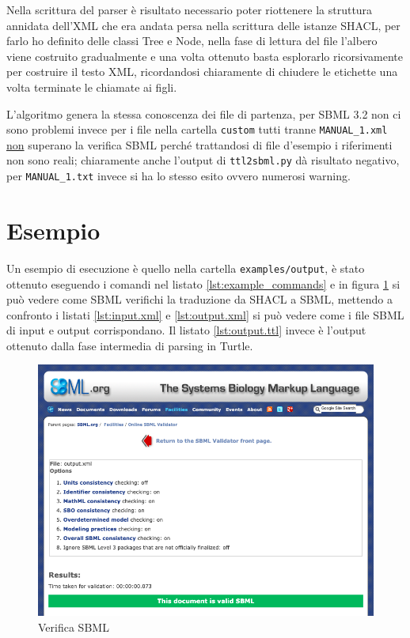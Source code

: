 \documentclass{article}
\begin{document}
Nella scrittura del parser è risultato necessario poter riottenere la struttura annidata dell'XML che era andata persa nella scrittura delle istanze SHACL, per farlo ho definito delle classi Tree e Node, nella fase di lettura del file l'albero viene costruito gradualmente e una volta ottenuto basta esplorarlo ricorsivamente per costruire il testo XML, ricordandosi chiaramente di chiudere le etichette una volta terminate le chiamate ai figli. 

L'algoritmo genera la stessa conoscenza dei file di partenza, per SBML 3.2 non ci sono problemi invece per i file nella cartella \texttt{custom} tutti tranne \texttt{MANUAL\_1.xml} \underline{non} superano la verifica SBML perché trattandosi di file d'esempio i riferimenti non sono reali; chiaramente anche l'output di \texttt{ttl2sbml.py} dà risultato negativo, per \texttt{MANUAL\_1.txt} invece si ha lo stesso esito ovvero numerosi warning.

\clearpage
\section{Esempio}
Un esempio di esecuzione è quello nella cartella \texttt{examples/output}, è stato ottenuto eseguendo i comandi nel listato \ref{lst:example_commands} e in figura \ref{fig:example_validation} si può vedere come SBML verifichi la traduzione da SHACL a SBML, mettendo a confronto i listati \ref{lst:input.xml} e \ref{lst:output.xml} si può vedere come i file SBML di input e output corrispondano. Il listato \ref{lst:output.ttl} invece è l'output ottenuto dalla fase intermedia di parsing in Turtle.



\begin{figure}[H]
    \caption{Verifica SBML}
    \label{fig:example_validation}
    \includegraphics[scale=0.43]{images/example_validation.png}
\end{figure}
\end{document}
